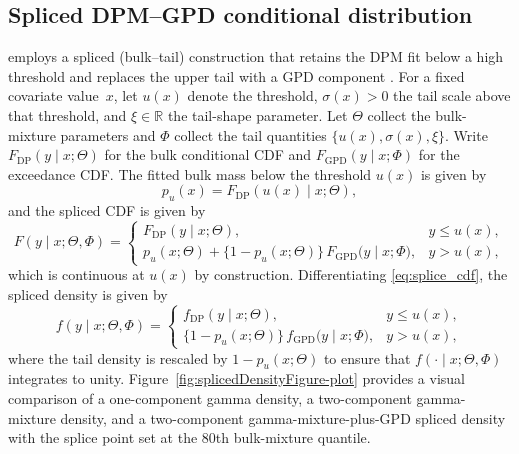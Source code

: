 \documentclass[article]{jss}\usepackage[]{graphicx}\usepackage[]{xcolor}
\begin{document}
\subsection{Spliced DPM--GPD conditional distribution}
\label{subsec:splice}

 employs a spliced (bulk--tail) construction that
retains the DPM fit below a high threshold and replaces the upper tail
with a GPD component
\citep{Frigessi2002,Behrens2004,Coles2001}.  For a fixed covariate
value~$x$, let $u(x)$ denote the threshold, $\sigma(x)>0$ the tail
scale above that threshold, and $\xi\in\mathbb{R}$ the tail-shape
parameter.  Let $\Theta$ collect the bulk-mixture parameters and
$\Phi$ collect the tail quantities $\{u(x),\sigma(x),\xi\}$.  Write
$F_{\mathrm{DP}}(y\mid x;\Theta)$ for the bulk conditional CDF and
$F_{\mathrm{GPD}}(y\mid x;\Phi)$ for the exceedance CDF.  The fitted bulk mass below the threshold $u(x)$ is given by
\begin{equation*}
p_u(x)=F_{\mathrm{DP}}(u(x)\mid x;\Theta),
\end{equation*}
and the spliced CDF is given by
\begin{equation}
F(y\mid x;\Theta,\Phi)=
\begin{cases}
F_{\mathrm{DP}}(y\mid x;\Theta), & y \le u(x),\\[6pt]
p_u(x;\Theta)
+
\bigl\{1-p_u(x;\Theta)\bigr\}\,
F_{\mathrm{GPD}}\!\bigl(y\mid x;\Phi\bigr),
& y>u(x),
\end{cases}
\label{eq:splice_cdf}
\end{equation}
which is continuous at $u(x)$ by construction.  Differentiating
\eqref{eq:splice_cdf}, the spliced density is given by
\begin{equation}
f(y\mid x;\Theta,\Phi)=
\begin{cases}
f_{\mathrm{DP}}(y\mid x;\Theta), & y \le u(x),\\[8pt]
\bigl\{1-p_u(x;\Theta)\bigr\}\,
f_{\mathrm{GPD}}\!\bigl(y\mid x;\Phi\bigr),
& y>u(x),
\end{cases}
\label{eq:splice_pdf}
\end{equation}
where the tail density is rescaled by $1-p_u(x;\Theta)$ to ensure that
$f(\cdot\mid x;\Theta,\Phi)$ integrates to unity.
Figure~\ref{fig:splicedDensityFigure-plot} provides a visual
comparison of a one-component gamma density, a two-component
gamma-mixture density, and a two-component gamma-mixture-plus-GPD
spliced density with the splice point set at the 80th bulk-mixture
quantile.
\end{document}
